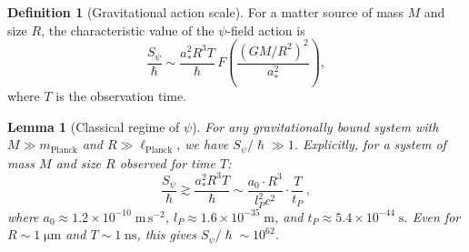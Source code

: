 \documentclass[12pt,a4paper]{article}
\newtheorem{lemma}[theorem]{Lemma}
\theoremstyle{definition}
\newtheorem{definition}[theorem]{Definition}
\theoremstyle{remark}
\newcommand{\hbar}{\hslash}
\begin{document}
\begin{definition}[Gravitational action scale]
For a matter source of mass $M$ and size $R$, the characteristic value of the
$\psi$-field action is
\begin{equation}
\label{eq:S_psi_estimate}
\frac{S_\psi}{\hbar} \sim \frac{a_*^2 R^3 T}{\hbar}\,
F\!\left(\frac{(GM/R^2)^2}{a_*^2}\right),
\end{equation}
where $T$ is the observation time.
\end{definition}

\begin{lemma}[Classical regime of $\psi$]
\label{lem:classical_psi}
For any gravitationally bound system with $M \gg m_{\mathrm{Planck}}$ and
$R \gg \ell_{\mathrm{Planck}}$, we have $S_\psi/\hbar \gg 1$.
Explicitly, for a system of mass $M$ and size $R$ observed for time $T$:
\begin{equation}
\frac{S_\psi}{\hbar} \gtrsim
\frac{a_*^2 R^3 T}{\hbar} \sim
\frac{a_0 \cdot R^3}{l_P^2 c^2} \cdot \frac{T}{t_P}\,,
\end{equation}
where $a_0 \approx 1.2 \times 10^{-10}\;\mathrm{m\,s^{-2}}$,
$l_P \approx 1.6\times 10^{-35}\;\mathrm{m}$, and
$t_P \approx 5.4\times 10^{-44}\;\mathrm{s}$.
Even for $R \sim 1\;\mathrm{\mu m}$ and $T \sim 1\;\mathrm{ns}$,
this gives $S_\psi/\hbar \sim 10^{62}$.
\end{lemma}
\end{document}
